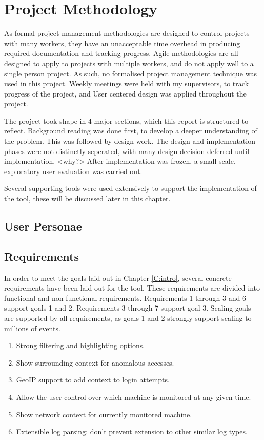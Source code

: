 \chapter{Project Methodology}\label{proj}

As formal project management methodologies are designed to control projects with many workers, they have an unacceptable time overhead in producing required documentation and tracking progress. Agile methodologies are all designed to apply to projects with multiple workers, and do not apply well to a single person project. As such, no formalised project management technique was used in this project.  
Weekly meetings were held with my supervisors, to track progress of the project, and User centered design was applied throughout the project. 

The project took shape in 4 major sections, which this report is structured to reflect. Background reading was done first, to develop a deeper understanding of the problem. This was followed by design work. The design and implementation phases were not distinctly seperated, with many design decision deferred until implementation. <why?> After implementation was frozen, a small scale, exploratory user evaluation was carried out.


Several supporting tools were used extensively to support the implementation of the tool, these will be discussed later in this chapter. 

\section{User Personae}

\section{Requirements}\label{reqs}

In order to meet the goals laid out in Chapter \ref{C:intro}, several concrete requirements have been laid out for the tool. These requirements are divided into functional and non-functional requirements. Requirements 1 through 3 and 6 support goals 1 and 2. Requirements 3 through 7 support goal 3. Scaling goals are supported by all requirements, as goals 1 and 2 strongly support scaling to millions of events.  

\begin{enumerate}
\item{Strong filtering and highlighting options.}
\item{Show surrounding context for anomalous accesses.}
\item{GeoIP support to add context to login attempts.}
\item{Allow the user control over which machine is monitored at any given time.}
\item{Show network context for currently monitored machine.}
\item{Extensible log parsing: don't prevent extension to other similar log types.}
\end{enumerate}

